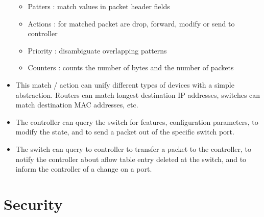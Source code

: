\begin{itemize}
  \begin{itemize}
  \tightlist
  \item
    Patters : match values in packet header fields
  \item
    Actions : for matched packet are drop, forward, modify or send to
    controller
  \item
    Priority : disambiguate overlapping patterns
  \item
    Counters : counts the number of bytes and the number of packets
  \end{itemize}
\item
  This match / action can unify different types of devices with a simple
  abstraction. Routers can match longest destination IP addresses,
  switches can match destination MAC addresses, etc.
\item
  The controller can query the switch for features, configuration
  parameters, to modify the state, and to send a packet out of the
  specific switch port.
\item
  The switch can query to controller to transfer a packet to the
  controller, to notify the controller about aflow table entry deleted
  at the switch, and to inform the controller of a change on a port.
\end{itemize}

\hypertarget{security}{%
\section{Security}\label{security}}

